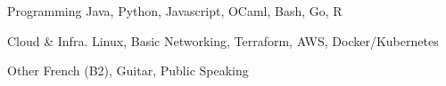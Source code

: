 


\begin{cvskills}


\cvskill
{Programming} %
{Java, Python, Javascript, OCaml, Bash, Go, R} %


\cvskill
{Cloud \& Infra.} %
{Linux, Basic Networking, Terraform, AWS, Docker/Kubernetes} %


\cvskill
{Other} %
{French (B2), Guitar, Public Speaking} %


\end{cvskills}
